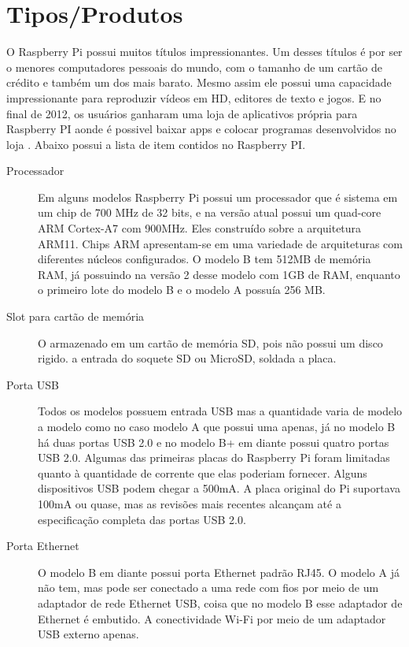 \documentclass[
	12pt,				%
	openright,			%
	twoside,			%
	a4paper,			%
	chapter=TITLE,		%
	english,			%
	brazil				%
	]{abntex2}
\begin{document}
\section{Tipos/Produtos}


O Raspberry Pi possui muitos títulos impressionantes. Um desses títulos é por ser o menores computadores pessoais do mundo, com o tamanho de um cartão de crédito e também um dos mais barato. Mesmo assim ele possui uma capacidade impressionante  para  reproduzir vídeos em HD, editores de texto e jogos. E no final de 2012, os usuários ganharam uma loja de aplicativos própria para Raspberry PI aonde é possivel baixar apps e colocar programas desenvolvidos no loja \cite{revistagalileu}. Abaixo possui a lista de item contidos no Raspberry PI.



\begin{description}

\item[Processador]
Em alguns modelos Raspberry Pi possui um processador que é sistema em um chip de 700 MHz de 32 bits, e na versão atual possui um  quad-core ARM Cortex-A7 com 900MHz. Eles construído sobre a arquitetura ARM11. Chips ARM apresentam-se em uma variedade de arquiteturas com diferentes núcleos configurados. O modelo B tem 512MB de memória RAM, já possuindo na versão 2 desse modelo com 1GB de RAM, enquanto o primeiro lote do modelo B e o modelo A possuía 256 MB.
 
\item[Slot para cartão de memória]
O armazenado em um cartão de memória SD, pois não possui um disco rigido. a entrada do soquete SD ou MicroSD, soldada a placa.

\item[Porta USB]
Todos os modelos possuem entrada USB mas a quantidade varia de modelo a modelo como no caso modelo A que possui uma apenas, já no modelo B há duas portas USB 2.0 e no modelo B+ em diante possui quatro portas USB 2.0. Algumas das primeiras placas do Raspberry Pi foram limitadas quanto à quantidade de corrente que elas poderiam fornecer. Alguns dispositivos USB podem chegar a 500mA. A placa original do Pi suportava 100mA ou quase, mas as revisões mais recentes alcançam até a especificação completa das portas USB 2.0.

\item[Porta Ethernet] 
O modelo B em diante possui porta Ethernet padrão RJ45. O modelo A já não tem, mas pode ser conectado a uma rede com fios por meio de um adaptador de rede Ethernet USB, coisa que no modelo B esse adaptador de Ethernet é embutido. A conectividade Wi-Fi por meio de um adaptador USB externo apenas.


\end{description}
\end{document}
